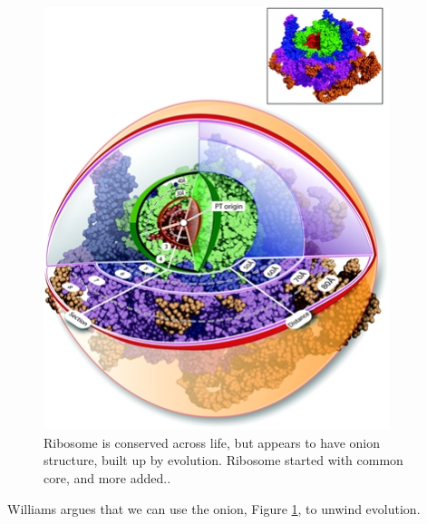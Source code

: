 \documentclass[]{article}
\begin{document}
\begin{figure}[H]
	\caption{Ribosome is conserved across life, but appears to have onion structure, built up by evolution. Ribosome started with common core, and more added.\cite{hsiao2009peeling}.}\label{fig:Ribosome} 
	\includegraphics[width=0.9\textwidth]{Ribosome}
\end{figure}
Williams argues that we can use the onion, Figure \ref{fig:Ribosome}, to unwind evolution.
\end{document}
